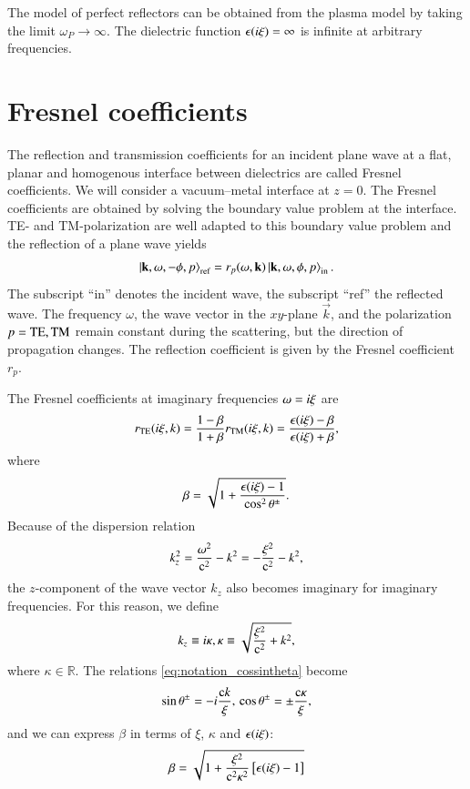 The model of perfect reflectors can be obtained from the plasma model by taking the limit
$\omega_P\to\infty$. The dielectric function $\epsilon(i\xi)=\infty$ is infinite at
arbitrary frequencies.

\section{Fresnel coefficients}
\label{section_optical_properties_fresnel}

The reflection and transmission coefficients for an incident plane wave at a
flat, planar and homogenous interface between dielectrics are called Fresnel
coefficients. We will consider a vacuum--metal interface at $z=0$. The Fresnel
coefficients are obtained by solving the boundary value problem at the
interface. TE- and TM-polarization are well adapted to this boundary value
problem and the reflection of a plane wave yields
\begin{equation}
\ket{ {\mathbf{k}}, \omega, -\phi, p}_\text{ref} = r_p(\omega,{\mathbf{k}}) \ket{ {\mathbf{k}}, \omega, \phi, p}_\text{in}.
\end{equation}
The subscript ``in'' denotes the incident wave, the subscript ``ref'' the
reflected wave. The frequency $\omega$, the wave vector in the $xy$-plane
$\vec k$, and the polarization $p={\mathrm{TE},\mathrm{TM}}$ remain constant during the
scattering, but the direction of propagation changes. The reflection
coefficient is given by the Fresnel coefficient $r_p$.

The Fresnel coefficients at imaginary frequencies $\omega=i\xi$ are \cite{jackson}
\begin{equation}
\label{eq:drude_fresnel_rtetm}
r_\text{TE}(i\xi, k) = \frac{1-\beta}{1+\beta} \\
r_\text{TM}(i\xi, k) = \frac{\epsilon(i\xi) - \beta}{\epsilon(i\xi) + \beta},
\end{equation}
where
\begin{equation}
\label{eq:drude_fresnel_beta}
\beta = \sqrt{1+\frac{\epsilon(i\xi)-1}{\cos^2{\theta^\pm}}}.
\end{equation}
Because of the dispersion relation
\begin{equation}
k_z^2 = \frac{\omega^2}{\mathrm{c}^2} - k^2 = -\frac{\xi^2}{\mathrm{c}^2} - k^2,
\end{equation}
the $z$-component of the wave vector $k_z$ also becomes imaginary for imaginary
frequencies. For this reason, we define
\begin{equation}
k_z \equiv i \kappa, \\
\kappa \equiv \sqrt{\frac{\xi^2}{\mathrm{c}^2}+k^2},
\end{equation}
where $\kappa \in \mathbb{R}$. The relations \eqref{eq:notation_cossintheta}
become
\begin{equation}
\sin\theta^\pm = -i \frac{\mathrm{c} k}{\xi}, \\
\cos\theta^\pm = \pm \frac{\mathrm{c} \kappa}{\xi},
\end{equation}
and we can express $\beta$ in terms of $\xi$, $\kappa$ and $\epsilon(i\xi)$:
\begin{equation}
\beta = \sqrt{1+\frac{\xi^2}{\mathrm{c}^2\kappa^2}\left[\epsilon(i\xi)-1\right]}
\end{equation}

